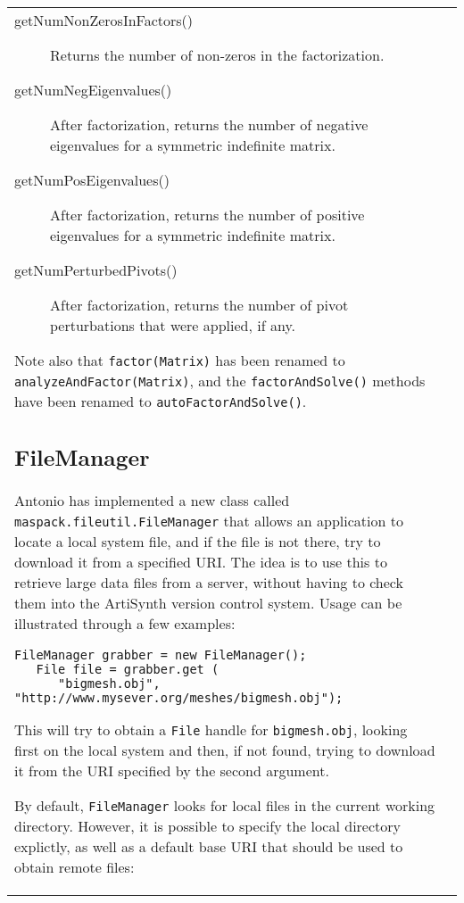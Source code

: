 \documentclass{article}
\begin{document}
\begin{tabular}{ll}
\begin{description}
\item[getNumNonZerosInFactors()] \mbox{}

Returns the number of non-zeros in the factorization.

\item[getNumNegEigenvalues()] \mbox{}

After factorization, returns the number of negative eigenvalues
for a symmetric indefinite matrix.

\item[getNumPosEigenvalues()] \mbox{}

After factorization, returns the number of positive eigenvalues
for a symmetric indefinite matrix.

\item[getNumPerturbedPivots()] \mbox{}

After factorization, returns the number of pivot perturbations 
that were applied, if any.

\end{description}

Note also that {\tt factor(Matrix)} has been renamed to {\tt
analyzeAndFactor(Matrix)}, and the {\tt factorAndSolve()}
methods have been renamed to {\tt autoFactorAndSolve()}.

\subsection*{FileManager}

Antonio has implemented a new class called {\tt maspack.fileutil.FileManager}
that allows an application to locate a local system
file, and if the file is not there, try to download it from a
specified URI. The idea is to use this to retrieve large data files
from a server, without having to check them into the ArtiSynth version
control system. Usage can be illustrated through a few examples:

\begin{lstlisting}[]
   FileManager grabber = new FileManager();
   File file = grabber.get (
      "bigmesh.obj", "http://www.mysever.org/meshes/bigmesh.obj");
\end{lstlisting}
This will try to obtain a {\tt File} handle for {\tt bigmesh.obj},
looking first on the local system and then, if not found, trying to
download it from the URI specified by the second argument.

By default, {\tt FileManager} looks for local files in the current
working directory. However, it is possible to specify the local
directory explictly, as well as a default base URI that should be used
to obtain remote files:


\end{tabular}
\end{document}
